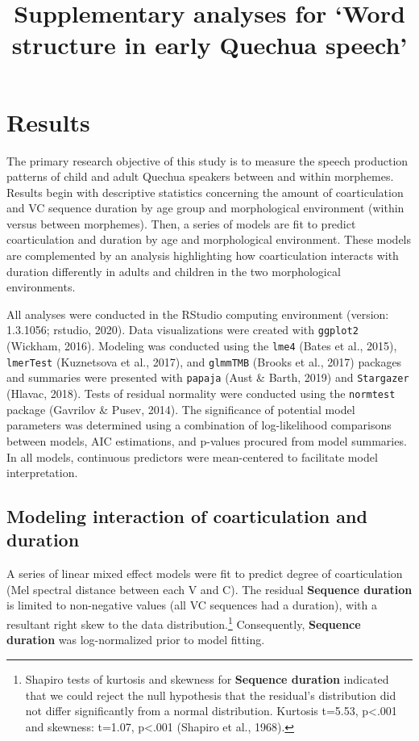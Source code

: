\documentclass[
]{article}
\title{Supplementary analyses for
`Word structure in early Quechua speech'}
\author{}
\date{\vspace{-2.5em}}
\begin{document}
\maketitle

{
\setcounter{tocdepth}{2}
\tableofcontents
}
\hypertarget{results}{%
\section{Results}\label{results}}

The primary research objective of this study is to measure the speech production patterns of child and adult Quechua speakers between and within morphemes. Results begin with descriptive statistics concerning the amount of coarticulation and VC sequence duration by age group and morphological environment (within versus between morphemes). Then, a series of models are fit to predict coarticulation and duration by age and morphological environment. These models are complemented by an analysis highlighting how coarticulation interacts with duration differently in adults and children in the two morphological environments.

All analyses were conducted in the RStudio computing environment (version: 1.3.1056; rstudio, 2020). Data visualizations were created with \texttt{ggplot2} (Wickham, 2016). Modeling was conducted using the \texttt{lme4} (Bates et al., 2015), \texttt{lmerTest} (Kuznetsova et al., 2017), and \texttt{glmmTMB} (Brooks et al., 2017) packages and summaries were presented with \texttt{papaja} (Aust \& Barth, 2019) and \texttt{Stargazer} (Hlavac, 2018). Tests of residual normality were conducted using the \texttt{normtest} package (Gavrilov \& Pusev, 2014). The significance of potential model parameters was determined using a combination of log-likelihood comparisons between models, AIC estimations, and p-values procured from model summaries. In all models, continuous predictors were mean-centered to facilitate model interpretation.

\hypertarget{modeling-interaction-of-coarticulation-and-duration}{%
\subsection{Modeling interaction of coarticulation and duration}\label{modeling-interaction-of-coarticulation-and-duration}}

A series of linear mixed effect models were fit to predict degree of coarticulation (Mel spectral distance between each V and C). The residual \textbf{Sequence duration} is limited to non-negative values (all VC sequences had a duration), with a resultant right skew to the data distribution.\footnote{Shapiro tests of kurtosis and skewness for \textbf{Sequence duration} indicated that we could reject the null hypothesis that the residual's distribution did not differ significantly from a normal distribution. Kurtosis t=5.53, p\textless.001 and skewness: t=1.07, p\textless.001 (Shapiro et al., 1968).} Consequently, \textbf{Sequence duration} was log-normalized prior to model fitting.
\end{document}
